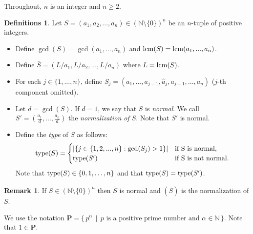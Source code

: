\documentclass[12pt]{amsart}
\theoremstyle{plain}
\theoremstyle{definition}
\newtheorem{definitions}[subsection]{Definitions}
\newtheorem{remark}[subsection]{Remark}
\newcommand{\lcm}{		\operatorname{{\rm lcm}}}
\newcommand{\type}{		\operatorname{{\rm type}}}
\newcommand{\setspec}[2]{\big\{\,#1\, \mid \,#2\, \big\}}
\newcommand{\Nat}{\ensuremath{\mathbb{N}}}
\begin{document}
Throughout, $n$ is an integer and $n \ge2$.
	
\begin{definitions}	\label{typeDef}
	Let $S = (a_1, a_2, ..., a_n) \in (\Nat \setminus\{0\})^n$ be an $n$-tuple of positive integers.
	
	\begin{itemize}
		\item Define $\gcd(S) = \gcd(a_1,...,a_n)$ and $\lcm(S) = \lcm(a_1, ..., a_n)$.
		\item Define $\bar{S} = (L/a_1, L/a_2,..., L/a_n)$ where $L = \lcm(S)$.  %
		\item For each $j \in \{1,\dots,n\}$, define $S_j = (a_1, ..., a_{j-1}, \hat a_j, a_{j+1}, ..., a_n)$ ($j$-th component omitted).
		
		\item Let $d = \gcd(S)$. If $d = 1$, we say that $S$ is \textit{normal}.
		We call $S' = (\frac{a_1}{d}, ... , \frac{a_n}{d})$ the \textit{normalization of $S$}. Note that $S'$ is normal.
		
		
		
		\item Define the \textit{type} of $S$ as follows:
		\begin{equation*}
		\type(S) = 
		\begin{cases}
		|\{j \in \{1,2,...,n\} : \gcd(S_j) > 1\}| & \text{if S is normal,}\\
		\type(S') & \text{if S is not normal.}
		\end{cases}
		\end{equation*}
Note that $\type(S) \in \{0,1,\dots,n\}$ and that $\type(S) = \type(S')$.

	\end{itemize}  
\end{definitions}

\begin{remark}
If $S \in (\Nat \setminus \{0\})^n$ then $\bar S$ is normal and $\overline{ (\bar S) }$ is the normalization of $S$.
\end{remark}

We use the notation $\mathbf{P} = \setspec{p^\alpha}{ \text{$p$ is a positive prime number and $\alpha \in \Nat$} }$.
Note that $1 \in \mathbf{P}$.
\end{document}
